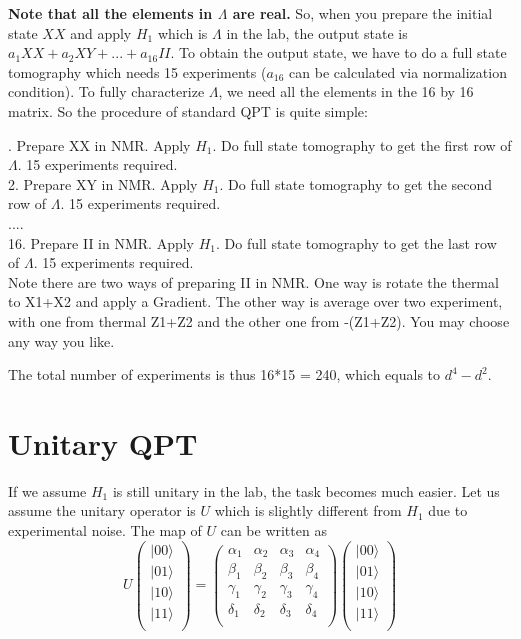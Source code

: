 \documentclass[12pt,nofootinbib,notitlepage,onecolumn,superscriptaddress]{revtex4-1}
\theoremstyle{plain}
\theoremstyle{definition}
\newcommand{\ket}[1]{\ensuremath{|#1\rangle}}
\newcommand{\be}{\begin{equation}}
\newcommand{\ee}{\end{equation}}
\begin{document}
\textbf{Note that all the elements in $\Lambda$ are real. }So, when you prepare the initial state $XX$ and apply $H_1$ which is $\Lambda$ in the lab, the output state is $a_1XX+a_2XY+...+a_{16}II$. To obtain the output state, we have to do a full state tomography which needs 15 experiments ($a_{16}$ can be calculated via normalization condition). To fully characterize $\Lambda$, we need all the elements in the 16 by 16 matrix. So the procedure of standard QPT is quite simple:

\medskip

. Prepare XX in NMR. Apply $H_1$. Do full state tomography to get the first row of $\Lambda$. 15 experiments required.\\
2. Prepare XY in NMR. Apply $H_1$. Do full state tomography to get the second row of $\Lambda$. 15 experiments required.\\
....\\
16. Prepare II in NMR. Apply $H_1$. Do full state tomography to get the last row of $\Lambda$. 15 experiments required.\\

Note there are two ways of preparing II in NMR. One way is rotate the thermal to X1+X2 and apply a Gradient. The other way is average over two experiment, with one from thermal Z1+Z2 and the other one from -(Z1+Z2). You may choose any way you like.

The total number of experiments is thus 16*15 = 240, which equals to $d^4-d^2$.

\section{Unitary QPT}

If we assume $H_1$ is still unitary in the lab, the task becomes much easier. Let us assume the unitary operator is $U$ which is slightly different from $H_1$ due to experimental noise. The map of $U$ can be written as
\be
U\left(
   \begin{array}{c}
     \ket{00} \\
     \ket{01}  \\
     \ket{10}  \\
     \ket{11}  \\
   \end{array}
 \right) = \left(
             \begin{array}{cccc}
               \alpha_1 & \alpha_2 & \alpha_3 & \alpha_4 \\
               \beta_1 & \beta_2 & \beta_3 & \beta_4 \\
               \gamma_1 & \gamma_2 & \gamma_3 & \gamma_4 \\
               \delta_1 & \delta_2 & \delta_3 & \delta_4 \\
             \end{array}
           \right)\left(
   \begin{array}{c}
     \ket{00} \\
     \ket{01}  \\
     \ket{10}  \\
     \ket{11}  \\
   \end{array}
 \right)
\ee
\end{document}
